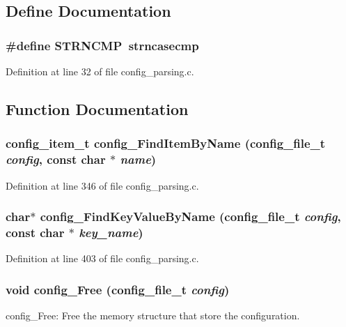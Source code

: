 \subsection{Define Documentation}
\subsubsection[{STRNCMP}]{\setlength{\rightskip}{0pt plus 5cm}\#define STRNCMP~strncasecmp}\label{config__parsing_8c_a83ae0cfa84a083508398239ded7c284d}


Definition at line 32 of file config\_\-parsing.c.

\subsection{Function Documentation}
\subsubsection[{config\_\-FindItemByName}]{\setlength{\rightskip}{0pt plus 5cm}config\_\-item\_\-t config\_\-FindItemByName (config\_\-file\_\-t {\em config}, \/  const char $\ast$ {\em name})}\label{config__parsing_8c_a124c884106272c278b7380b2ea98248d}


Definition at line 346 of file config\_\-parsing.c.
\subsubsection[{config\_\-FindKeyValueByName}]{\setlength{\rightskip}{0pt plus 5cm}char$\ast$ config\_\-FindKeyValueByName (config\_\-file\_\-t {\em config}, \/  const char $\ast$ {\em key\_\-name})}\label{config__parsing_8c_aba7f16a9ea9f6710f6a7f569848780ad}


Definition at line 403 of file config\_\-parsing.c.
\subsubsection[{config\_\-Free}]{\setlength{\rightskip}{0pt plus 5cm}void config\_\-Free (config\_\-file\_\-t {\em config})}\label{config__parsing_8c_a21ff635ca4517f5da8111d943372e423}
config\_\-Free: Free the memory structure that store the configuration. 

